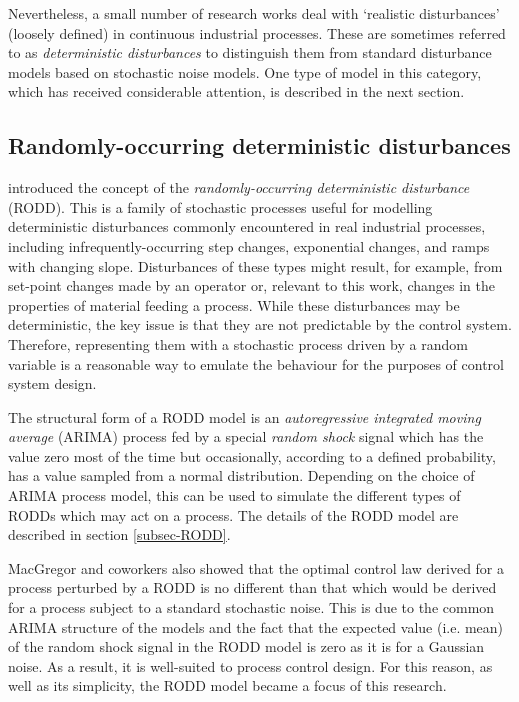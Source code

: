 Nevertheless, a small number of research works deal with `realistic disturbances' (loosely defined) in continuous industrial processes. These are sometimes referred to as \textit{deterministic disturbances} to distinguish them from standard disturbance models based on stochastic noise models. One type of model in this category, which has received considerable attention, is described in the next section.

\subsection{Randomly-occurring deterministic disturbances} \label{RODDs}

\cite{macgregor_duality_1984} introduced the concept of the \textit{randomly-occurring deterministic disturbance} (RODD). This is a family of stochastic processes useful for modelling deterministic disturbances commonly encountered in real industrial processes, including  infrequently-occurring step changes, exponential changes, and ramps with changing slope. Disturbances of these types might result, for example, from set-point changes made by an operator or, relevant to this work, changes in the properties of material feeding a process. While these disturbances may be deterministic, the key issue is that they are not predictable by the control system. Therefore, representing them with a stochastic process driven by a random variable is a reasonable way to emulate the behaviour for the purposes of control system design.

The structural form of a RODD model is an \textit{autoregressive integrated moving average} (ARIMA) process fed by a special \textit{random shock} signal which has the value zero most of the time but occasionally, according to a defined probability, has a value sampled from a normal distribution. Depending on the choice of ARIMA process model, this can be used to simulate the different types of RODDs which may act on a process. The details of the RODD model are described in section \ref{subsec-RODD}.

MacGregor and coworkers also showed that the optimal control law derived for a process perturbed by a RODD is no different than that which would be derived for a process subject to a standard stochastic noise.  This is due to the common ARIMA structure of the models and the fact that the expected value (i.e. mean) of the random shock signal in the RODD model is zero as it is for a Gaussian noise. As a result, it is well-suited to process control design. For this reason, as well as its simplicity, the RODD model became a focus of this research.


